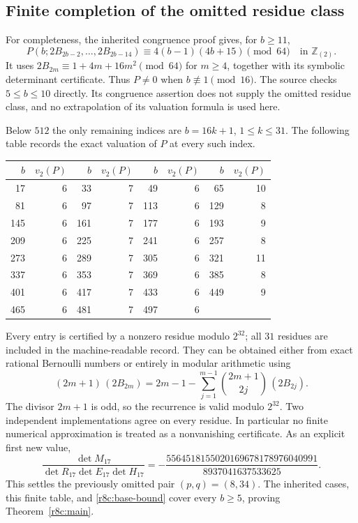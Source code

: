 \documentclass[11pt,a4paper]{article}
\numberwithin{equation}{section}
\theoremstyle{plain}
\theoremstyle{definition}
\theoremstyle{remark}
\begin{document}
\subsection{Finite completion of the omitted residue class}

For completeness, the inherited congruence proof gives, for $b\ge11$,
\[
 P(b;2B_{2b-2},\ldots,2B_{2b-14})
       \equiv4(b-1)(4b+15)\pmod {64}
       \quad\text{in }\mathbb Z_{(2)}.
\]
It uses $2B_{2m}\equiv1+4m+16m^2\pmod {64}$ for $m\ge4$,
together with its symbolic determinant certificate. Thus $P\ne0$
when $b\not\equiv1\pmod {16}$. The source checks $5\le b\le10$
directly. Its congruence assertion does not supply the omitted
residue class, and no extrapolation of its valuation formula is
used here.

Below $512$ the only remaining indices are $b=16k+1$,
$1\le k\le31$. The following table records the exact valuation
of $P$ at every such index.
\begin{center}
\begin{tabular}{r r@{\qquad}r r@{\qquad}r r@{\qquad}r r}
\hline
$b$&$v_2(P)$&$b$&$v_2(P)$&$b$&$v_2(P)$&$b$&$v_2(P)$\\
\hline
17&6&33&7&49&6&65&10\\
81&6&97&7&113&6&129&8\\
145&6&161&7&177&6&193&9\\
209&6&225&7&241&6&257&8\\
273&6&289&7&305&6&321&11\\
337&6&353&7&369&6&385&8\\
401&6&417&7&433&6&449&9\\
465&6&481&7&497&6&&\\
\hline
\end{tabular}
\end{center}
Every entry is certified by a nonzero residue modulo $2^{32}$;
all $31$ residues are included in the machine-readable record.
They can be obtained either from exact rational Bernoulli numbers
or entirely in modular arithmetic using
\[
 (2m+1)\,(2B_{2m})
 =2m-1-\sum_{j=1}^{m-1}\binom{2m+1}{2j}\,(2B_{2j}).
\]
The divisor $2m+1$ is odd, so the recurrence is valid modulo
$2^{32}$. Two independent implementations agree on every residue.
In particular no finite numerical approximation is treated as a
nonvanishing certificate. As an explicit first new value,
\[
 \frac{\det M_{17}}{\det R_{17}\det E_{17}\det H_{17}}
   =-\frac{5564518155020169678178976040991}{8937041637533625}.
\]
This settles the previously omitted pair $(p,q)=(8,34)$.
The inherited cases, this finite table, and
\eqref{r8c:base-bound} cover every $b\ge5$, proving
Theorem~\ref{r8c:main}.
\end{document}
